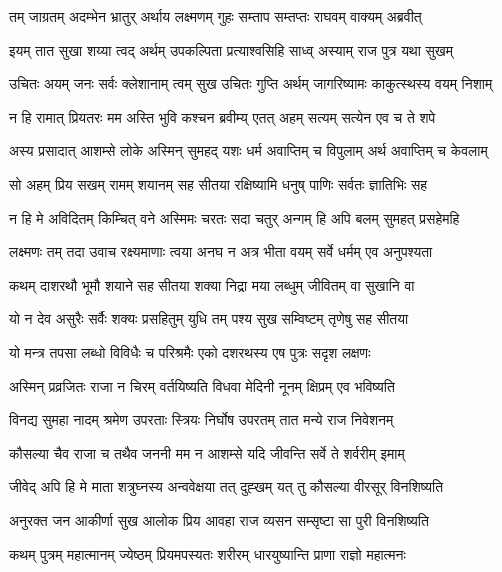 
\twolineshloka
{तम् जाग्रतम् अदम्भेन भ्रातुर् अर्थाय लक्ष्मणम्}
{गुहः सम्ताप सम्तप्तः राघवम् वाक्यम् अब्रवीत्} %

\twolineshloka
{इयम् तात सुखा शय्या त्वद् अर्थम् उपकल्पिता}
{प्रत्याश्वसिहि साध्व् अस्याम् राज पुत्र यथा सुखम्} %

\twolineshloka
{उचितः अयम् जनः सर्वः क्लेशानाम् त्वम् सुख उचितः}
{गुप्ति अर्थम् जागरिष्यामः काकुत्स्थस्य वयम् निशाम्} %

\twolineshloka
{न हि रामात् प्रियतरः मम अस्ति भुवि कश्चन}
{ब्रवीम्य् एतत् अहम् सत्यम् सत्येन एव च ते शपे} %

\twolineshloka
{अस्य प्रसादात् आशम्से लोके अस्मिन् सुमहद् यशः}
{धर्म अवाप्तिम् च विपुलाम् अर्थ अवाप्तिम् च केवलाम्} %

\twolineshloka
{सो अहम् प्रिय सखम् रामम् शयानम् सह सीतया}
{रक्षिष्यामि धनुष् पाणिः सर्वतः ज्ञातिभिः सह} %

\twolineshloka
{न हि मे अविदितम् किम्चित् वने अस्मिमः चरतः सदा}
{चतुर् अन्गम् हि अपि बलम् सुमहत् प्रसहेमहि} %

\twolineshloka
{लक्ष्मणः तम् तदा उवाच रक्ष्यमाणाः त्वया अनघ}
{न अत्र भीता वयम् सर्वे धर्मम् एव अनुपश्यता} %

\twolineshloka
{कथम् दाशरथौ भूमौ शयाने सह सीतया}
{शक्या निद्रा मया लब्धुम् जीवितम् वा सुखानि वा} %

\twolineshloka
{यो न देव असुरैः सर्वैः शक्यः प्रसहितुम् युधि}
{तम् पश्य सुख सम्विष्टम् तृणेषु सह सीतया} %

\twolineshloka
{यो मन्त्र तपसा लब्धो विविधैः च परिश्रमैः}
{एको दशरथस्य एष पुत्रः सदृश लक्षणः} %

\twolineshloka
{अस्मिन् प्रव्रजितः राजा न चिरम् वर्तयिष्यति}
{विधवा मेदिनी नूनम् क्षिप्रम् एव भविष्यति} %

\twolineshloka
{विनद्य सुमहा नादम् श्रमेण उपरताः स्त्रियः}
{निर्घोष उपरतम् तात मन्ये राज निवेशनम्} %

\twolineshloka
{कौसल्या चैव राजा च तथैव जननी मम}
{न आशम्से यदि जीवन्ति सर्वे ते शर्वरीम् इमाम्} %

\twolineshloka
{जीवेद् अपि हि मे माता शत्रुघ्नस्य अन्ववेक्षया}
{तत् दुह्खम् यत् तु कौसल्या वीरसूर् विनशिष्यति} %

\twolineshloka
{अनुरक्त जन आकीर्णा सुख आलोक प्रिय आवहा}
{राज व्यसन सम्सृष्टा सा पुरी विनशिष्यति} %

\twolineshloka
{कथम् पुत्रम् महात्मानम् ज्येष्ठम् प्रियमपस्यतः}
{शरीरम् धारयुष्यान्ति प्राणा राज्ञो महात्मनः} %

